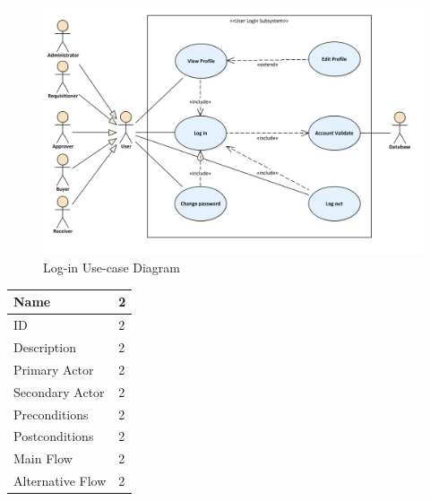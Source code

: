 \documentclass[12pt]{report} %
\begin{document}
\ifx

\begin{center}
\begin{figure}[h]
	\begin{center}
	\includegraphics[width=.8\textwidth]{pic/usecase/seupr_usecase_login.png}
	\end{center}
	\caption{Log-in Use-case Diagram}
	\label{fig:seupr_usecase_login}
\end{figure}
\end{center}

\fi


\ifx

\begin{tabular}{|l|l|}
\hline
 Name & 2 \\
\hline
 ID & 2 \\
 \hline
 Description & 2 \\
\hline
 Primary Actor & 2 \\
 \hline
 Secondary Actor & 2 \\
\hline
 Preconditions & 2 \\
 \hline
 Postconditions & 2 \\
\hline
 Main Flow & 2 \\
 \hline
 Alternative Flow & 2 \\
\hline
 
\end{tabular}
\fi


\ifx
\end{document}
